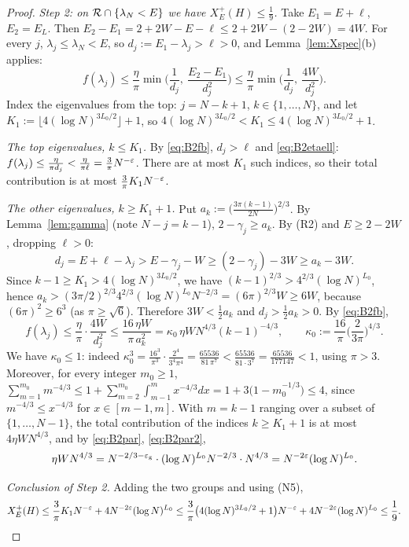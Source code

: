 \begin{proof}
\emph{Step 2: on $\mathcal{R}\cap\{\lambda_N<E\}$ we have $X^+_E(H)\le\frac19$.} Take $E_1=E+\ell$, $E_2=E_L$. Then
$E_2-E_1=2+2W-E-\ell\le2+2W-(2-2W)=4W$. For every $j$, $\lambda_j\le\lambda_N<E$, so $d_j:=E_1-\lambda_j>\ell>0$, and Lemma~\ref{lem:Xspec}(b) applies:
\begin{equation}\label{eq:B2fb}
f(\lambda_j)\le\frac\eta\pi\min\Big(\frac1{d_j},\ \frac{E_2-E_1}{d_j^2}\Big)\le\frac\eta\pi\min\Big(\frac1{d_j},\ \frac{4W}{d_j^2}\Big).
\end{equation}
Index the eigenvalues from the top: $j=N-k+1$, $k\in\{1,\dots,N\}$, and let $K_1:=\lfloor4(\log N)^{3L_0/2}\rfloor+1$, so $4(\log N)^{3L_0/2}<K_1\le4(\log N)^{3L_0/2}+1$.

\emph{The top eigenvalues, $k\le K_1$.} By \eqref{eq:B2fb}, $d_j>\ell$ and \eqref{eq:B2etaell}: $f(\lambda_j)\le\frac{\eta}{\pi d_j}<\frac\eta{\pi\ell}=\frac3\pi N^{-\varepsilon}$.
There are at most $K_1$ such indices, so their total contribution is at most $\frac3\pi K_1N^{-\varepsilon}$.

\emph{The other eigenvalues, $k\ge K_1+1$.} Put $a_k:=\big(\frac{3\pi(k-1)}{2N}\big)^{2/3}$. By Lemma~\ref{lem:gamma} (note $N-j=k-1$), $2-\gamma_j\ge a_k$. By (R2) and
$E\ge2-2W$, dropping $\ell>0$:
\[
d_j=E+\ell-\lambda_j>E-\gamma_j-W\ge(2-\gamma_j)-3W\ge a_k-3W.
\]
Since $k-1\ge K_1>4(\log N)^{3L_0/2}$, we have $(k-1)^{2/3}>4^{2/3}(\log N)^{L_0}$, hence
$a_k>(3\pi/2)^{2/3}4^{2/3}(\log N)^{L_0}N^{-2/3}=(6\pi)^{2/3}W\ge6W$, because $(6\pi)^2\ge6^3$ (as $\pi\ge\sqrt6$). Therefore $3W<\frac12a_k$ and $d_j>\frac12a_k>0$.
By \eqref{eq:B2fb},
\[
f(\lambda_j)\le\frac\eta\pi\cdot\frac{4W}{d_j^2}\le\frac{16\,\eta W}{\pi\,a_k^2}=\kappa_0\,\eta WN^{4/3}(k-1)^{-4/3},\qquad
\kappa_0:=\frac{16}\pi\Big(\frac2{3\pi}\Big)^{4/3}.
\]
We have $\kappa_0\le1$: indeed $\kappa_0^3=\frac{16^3}{\pi^3}\cdot\frac{2^4}{3^4\pi^4}=\frac{65536}{81\,\pi^7}<\frac{65536}{81\cdot3^7}=\frac{65536}{177147}<1$, using $\pi>3$.
Moreover, for every integer $m_0\ge1$, $\sum_{m=1}^{m_0}m^{-4/3}\le1+\sum_{m=2}^{m_0}\int_{m-1}^mx^{-4/3}dx=1+3\big(1-m_0^{-1/3}\big)\le4$, since
$m^{-4/3}\le x^{-4/3}$ for $x\in[m-1,m]$. With $m=k-1$ ranging over a subset of $\{1,\dots,N-1\}$, the total contribution of the indices $k\ge K_1+1$ is at most
$4\eta WN^{4/3}$, and by \eqref{eq:B2par}, \eqref{eq:B2par2},
\[
\eta WN^{4/3}=N^{-2/3-\varepsilon_{\mathrm g}}\cdot(\log N)^{L_0}N^{-2/3}\cdot N^{4/3}=N^{-2\varepsilon}(\log N)^{L_0}.
\]

\emph{Conclusion of Step 2.} Adding the two groups and using (N5),
\[
X^+_E(H)\le\frac3\pi K_1N^{-\varepsilon}+4N^{-2\varepsilon}(\log N)^{L_0}\le\frac3\pi\big(4(\log N)^{3L_0/2}+1\big)N^{-\varepsilon}+4N^{-2\varepsilon}(\log N)^{L_0}\le\frac19 .
\]


\end{proof}

